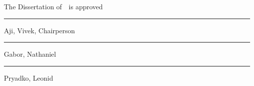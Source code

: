 \newcommand{\signatureblock}[1]{%
  \begin{minipage}{10cm}
    \hrule\smallskip #1
  \end{minipage}
}

\clearpage
\thispagestyle{empty}
\centering
\vspace*{-\toptafiddle}

The Dissertation of~\theauthor~is approved

\vfill

\signatureblock{Aji, Vivek, Chairperson}
\vfill
\signatureblock{Gabor, Nathaniel}
\vfill
\signatureblock{Pryadko, Leonid}

\vfill

\textsc{\theuniversity}

\enlargethispage{\bottafiddle}
\clearpage
